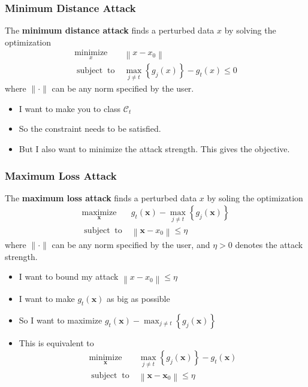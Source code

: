 \documentclass[8pt,dvipsnames]{beamer}
\newenvironment{customtheorem}[1]
{%
	\tcolorbox[
	enhanced,
	colback=blue!5,
	colframe=blue!60!black,
	coltitle=black,
	colbacktitle=blue!5,
	fonttitle=\bfseries,
	attach boxed title to top left={yshift=-2mm, xshift=2mm},
	boxed title style={sharp corners},
	sharp corners,
	title=#1
	]
}
{%
	\endtcolorbox
}
\begin{document}
\begin{frame}
	\frametitle{Minimum Distance Attack}
	\begin{customtheorem}{Minimum Distance Attack}
		The \textbf{minimum distance attack} finds a perturbed data $x$ by solving the optimization
		$$
		\begin{array}{ll}\underset{x}{\operatorname{minimize}} & \left\|x-x_{0}\right\| \\ \operatorname { subject} \operatorname{to} & \max _{j \neq t}\left\{g_{j}(x)\right\}-g_{t}(x) \leq 0\end{array}
		$$
		where \(\|\cdot\|\) can be any norm specified by the user.
	\end{customtheorem}
	\begin{itemize}
		\item I want to make you to class $\mathcal{C}_t$
		\item So the constraint needs to be satisﬁed.
		\item But I also want to minimize the attack strength. This gives the objective.
	\end{itemize}
\end{frame}

\begin{frame}
	\frametitle{Maximum Loss Attack}
	\begin{customtheorem}{Maximum Loss Attack}
		The \textbf{maximum loss attack} finds a perturbed data \(x\) by soling the optimization
		$$
		\begin{array}{ll}\underset{\boldsymbol{x}}{\operatorname{maximize}} & g_{t}(\boldsymbol{x})-\max _{j \neq t}\left\{g_{j}(\boldsymbol{x})\right\} \\ \operatorname { subject} \operatorname{to} & \left\|\boldsymbol{x}-x_{0}\right\| \leq \eta\end{array}
		$$
		where \(\|\cdot\|\) can be any norm specified by the user, and \(\eta>0\) denotes the attack strength.
	\end{customtheorem}
	\begin{itemize}
		\item I want to bound my attack \(\left\|x-x_{0}\right\| \leq \eta\)
		\item I want to make \(g_{t}(\boldsymbol{x})\) as big as possible
		\item So I want to maximize \(g_{t}(\boldsymbol{x})-\max _{j \neq t}\left\{g_{j}(\boldsymbol{x})\right\}\)
		\item This is equivalent to 
		$$
		\begin{array}{ll}\underset{\boldsymbol{x}}{\operatorname{minimize}} & \max _{j \neq t}\left\{g_{j}(\boldsymbol{x})\right\}-g_{t}(\boldsymbol{x}) \\ \operatorname { subject} \operatorname{to} & \left\|\boldsymbol{x}-\boldsymbol{x}_{0}\right\| \leq \eta\end{array}
		$$
	\end{itemize}
\end{frame}
\end{document}
